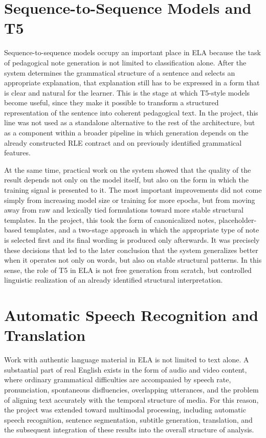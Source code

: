 \documentclass[12pt,a4paper,oneside]{report}
\begin{document}
\section{Sequence-to-Sequence Models and T5}
Sequence-to-sequence models occupy an important place in ELA because the task of pedagogical note generation is not limited to classification alone. After the system determines the grammatical structure of a sentence and selects an appropriate explanation, that explanation still has to be expressed in a form that is clear and natural for the learner. This is the stage at which T5-style models become useful, since they make it possible to transform a structured representation of the sentence into coherent pedagogical text. In the project, this line was not used as a standalone alternative to the rest of the architecture, but as a component within a broader pipeline in which generation depends on the already constructed RLE contract and on previously identified grammatical features.

At the same time, practical work on the system showed that the quality of the result depends not only on the model itself, but also on the form in which the training signal is presented to it. The most important improvements did not come simply from increasing model size or training for more epochs, but from moving away from raw and lexically tied formulations toward more stable structural templates. In the project, this took the form of canonicalized notes, placeholder-based templates, and a two-stage approach in which the appropriate type of note is selected first and its final wording is produced only afterwards. It was precisely these decisions that led to the later conclusion that the system generalizes better when it operates not only on words, but also on stable structural patterns. In this sense, the role of T5 in ELA is not free generation from scratch, but controlled linguistic realization of an already identified structural interpretation.

\section{Automatic Speech Recognition and Translation}
Work with authentic language material in ELA is not limited to text alone. A substantial part of real English exists in the form of audio and video content, where ordinary grammatical difficulties are accompanied by speech rate, pronunciation, spontaneous disfluencies, overlapping utterances, and the problem of aligning text accurately with the temporal structure of media. For this reason, the project was extended toward multimodal processing, including automatic speech recognition, sentence segmentation, subtitle generation, translation, and the subsequent integration of these results into the overall structure of analysis.
\end{document}

